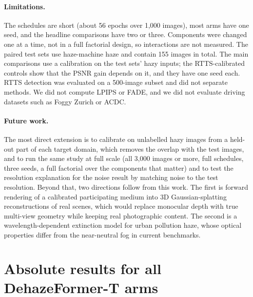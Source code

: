 \documentclass{article}
\begin{document}
\paragraph{Limitations.} The schedules are short (about 56 epochs over 1{,}000 images), most arms have one seed, and the headline comparisons have two or three. Components were changed one at a time, not in a full factorial design, so interactions are not measured. The paired test sets use haze-machine haze and contain 155 images in total. The main comparisons use a calibration on the test sets' hazy inputs; the RTTS-calibrated controls show that the PSNR gain depends on it, and they have one seed each. RTTS detection was evaluated on a 500-image subset and did not separate methods. We did not compute LPIPS or FADE, and we did not evaluate driving datasets such as Foggy Zurich or ACDC.

\paragraph{Future work.} The most direct extension is to calibrate on unlabelled hazy images from a held-out part of each target domain, which removes the overlap with the test images, and to run the same study at full scale (all 3{,}000 images or more, full schedules, three seeds, a full factorial over the components that matter) and to test the resolution explanation for the noise result by matching noise to the test resolution. Beyond that, two directions follow from this work. The first is forward rendering of a calibrated participating medium into 3D Gaussian-splatting reconstructions of real scenes, which would replace monocular depth with true multi-view geometry while keeping real photographic content. The second is a wavelength-dependent extinction model for urban pollution haze, whose optical properties differ from the near-neutral fog in current benchmarks.




\appendix
\section{Absolute results for all DehazeFormer-T arms}
\begin{table}[h]
\caption{DehazeFormer-T trained from scratch on each arm (mean over seeds). Best value per column in bold.}
\label{tab:arms}
\centering
\small
\resizebox{\linewidth}{!}{}
\end{table}
\end{document}
